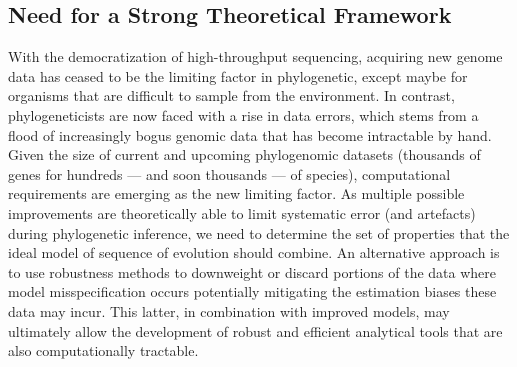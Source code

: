 \subsection{Need for a Strong Theoretical Framework} 

With the democratization of high-throughput sequencing, acquiring new genome data has ceased to be the limiting factor in phylogenetic, except maybe for organisms that are difficult to sample from the environment. In contrast, phylogeneticists are now faced with a rise in data errors, which stems from a flood of increasingly bogus genomic data that has become intractable by hand. Given the size of current and upcoming phylogenomic datasets (thousands of genes for hundreds —   and soon thousands —   of species), computational requirements are emerging as the new limiting factor. As multiple possible improvements are theoretically able to limit systematic error (and artefacts) during phylogenetic inference, we  need  to determine the set of properties that the ideal model of sequence of evolution should combine.  An alternative approach is to use robustness methods to downweight or discard portions of the data where model misspecification occurs potentially mitigating the estimation biases these data may incur. This latter, in combination with improved models, may ultimately allow the development of robust and efficient analytical
tools that are also computationally tractable. 
